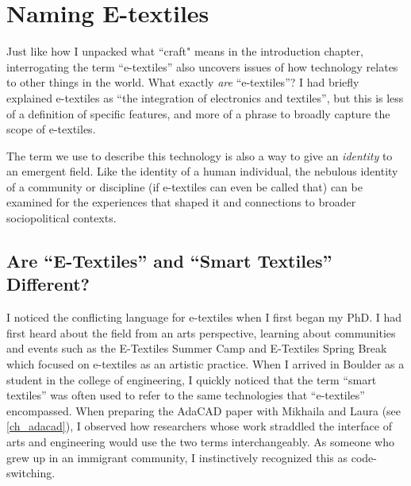 \chapter{Naming E-textiles}
\label{ch_e-textiles}

Just like how I unpacked what ``craft" means in the introduction chapter, interrogating the term ``e-textiles'' also uncovers issues of how technology relates to other things in the world. What exactly \textit{are} ``e-textiles''? I had briefly explained e-textiles as ``the integration of electronics and textiles'', but this is less of a definition of specific features, and more of a phrase to broadly capture the scope of e-textiles. 

The term we use to describe this technology is also a way to give an \textit{identity} to an emergent field. Like the identity of a human individual, the nebulous identity of a community or discipline (if e-textiles can even be called that) can be examined for the experiences that shaped it and connections to broader sociopolitical contexts. 

\section{Are ``E-Textiles'' and ``Smart Textiles'' Different?}
\label{sct_e-textiles_motivation}

I noticed the conflicting language for e-textiles when I first began my PhD. I had first heard about the field from an arts perspective, learning about communities and events such as the E-Textiles Summer Camp \cite{noauthor_httpetextile-summercamporg_nodate} and E-Textiles Spring Break which focused on e-textiles as an artistic practice. When I arrived in Boulder as a student in the college of engineering, I quickly noticed that the term ``smart textiles'' was often used to refer to the same technologies that ``e-textiles'' encompassed. When preparing the AdaCAD paper with Mikhaila and Laura (see \ref{ch_adacad}), I observed how researchers whose work straddled the interface of arts and engineering would use the two terms interchangeably. As someone who grew up in an immigrant community, I instinctively recognized this as code-switching.

